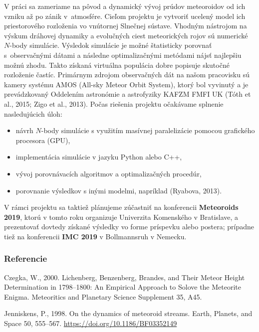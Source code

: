 V práci sa zameriame na pôvod a dynamický vývoj prúdov meteoroidov od
ich vzniku až po zánik v~atmosfére. Cieľom projektu je vytvoriť ucelený
model ich priestorového rozloženia vo vnútornej Slnečnej sústave.
Vhodným nástrojom na výskum dráhovej dynamiky a evolučných ciest
meteorických rojov sú numerické \(N\)-body simulácie. Výsledok simulácie
je možné štatisticky porovnať s~observačnými dátami a následne
optimalizačnými metódami nájsť najlepšiu možnú zhodu. Takto získaná
virtuálna populácia dobre popisuje skutočné rozloženie častíc. Primárnym
zdrojom observačných dát na našom pracovisku sú kamery systému AMOS
(All-sky Meteor Orbit System), ktorý bol vyvinutý a je prevádzkovaný
Oddelením astronómie a astrofyziky KAFZM FMFI UK (Tóth et al., 2015;
Zigo et al., 2013). Počas riešenia projektu očakávame splnenie
nasledujúcich úloh:

\begin{itemize}
\tightlist
\item
  návrh \(N\)-body simulácie s využitím masívnej paralelizácie pomocou
  grafického procesora (GPU),
\item
  implementácia simulácie v jazyku Python alebo C++,
\item
  vývoj porovnávacích algoritmov a optimalizačných procedúr,
\item
  porovnanie výsledkov s inými modelmi, napríklad (Ryabova, 2013).
\end{itemize}

V rámci projektu sa taktiež plánujeme zúčastniť na konferencii
\textbf{Meteoroids 2019}, ktorú v tomto roku organizuje Univerzita
Komenského v Bratislave, a prezentovať dovtedy získané výsledky vo forme
príspevku alebo postera; prípadne tiež na konferencii \textbf{IMC 2019}
v Bollmannsruh v Nemecku.

\hypertarget{referencie}{%
\subsubsection*{Referencie}\label{referencie}}

\hypertarget{refs}{}
\leavevmode\hypertarget{ref-czegka2000}{}%
Czegka, W., 2000. Lichenberg, Benzenberg, Brandes, and Their Meteor
Height Determination in 1798--1800: An Empirical Approach to Solove the
Meteorite Enigma. Meteoritics and Planetary Science Supplement 35, A45.

\leavevmode\hypertarget{ref-jenniskens1998}{}%
Jenniskens, P., 1998. On the dynamics of meteoroid streams. Earth,
Planets, and Space 50, 555--567.
\url{https://doi.org/10.1186/BF03352149}

